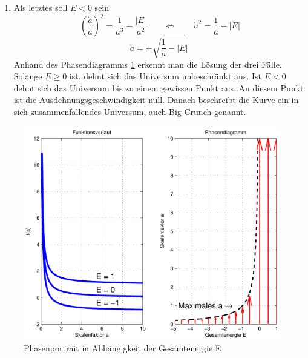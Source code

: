 \begin{refsection}
\begin{enumerate}
	\item Als letztes soll $E < 0$ sein
	\[\ \left(\frac{\dot{a}}{a} \right)^2 = \frac{1}{a^3} - \frac{|E|}{a^2} \qquad \Leftrightarrow \qquad \dot{a}^2 = \frac{1}{a} - |E|\]
	\begin{equation}
	\dot{a} = \pm \sqrt{\frac{1}{a} - |E|}
	\end{equation}
	Anhand des Phasendiagramms \ref{friedmann:phasenportrait} erkennt man die Lösung der drei Fälle. Solange $E \geq 0$ ist, dehnt sich das Universum unbeschränkt aus. Ist $E < 0$ dehnt sich das Universum bis zu einem gewissen Punkt aus. An diesem Punkt ist die Ausdehnungsgeschwindigkeit null. Danach beschreibt die Kurve ein in sich zusammenfallendes Universum, auch Big-Crunch genannt.
	
\end{enumerate}

\begin{figure}[h]
	\centering
	\includegraphics[width  = \textwidth]{friedmann/images/phasendiagramm.pdf}
	\caption{Phasenportrait in Abhängigkeit der Gesamtenergie E
		\label{friedmann:phasenportrait}}
\end{figure}%


\end{refsection}
